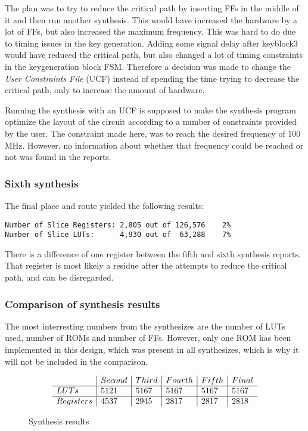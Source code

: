 The plan was to try to reduce the critical path by inserting FFs in the 
middle of it and then run another synthesis. This would have increased 
the hardware by a lot of FFs, but also increased the maximum frequency. 
This was hard to do due to timing issues in the key generation. Adding 
some signal delay after keyblock3 would have reduced the critical path, 
but also changed a lot of timing constraints in the keygeneration 
block FSM. Therefore a decision was made to change the \emph{User 
Constraints File} (UCF) instead of spending the time trying to 
decrease the critical path, only to increase the amount of hardware.

Running the synthesis with an UCF is supposed to make the synthesis 
program optimize the layout of the circuit according to a number of 
constraints provided by the user. The constraint made here, was to 
reach the desired frequency of 100 MHz. However, no information about 
whether that frequency could be reached or not was found in the reports.

\subsubsection{Sixth synthesis}
The final place and route yielded the following results:
\begin{verbatim}
Number of Slice Registers: 2,805 out of 126,576    2%
Number of Slice LUTs:      4,930 out of  63,288    7%
\end{verbatim}

There is a difference of one register between the fifth and sixth 
synthesis reports. That register is most likely a residue after the 
attempts to reduce the critical path, and can be disregarded.

\subsubsection{Comparison of synthesis results}
The most interresting numbers from the synthesizes are the number of 
LUTs used, number of ROMs and number of FFs. However, only one ROM has 
been implemented in this design, which was present in all synthesizes, 
which is why it will not be included in the comparison.
\begin{figure}[h!]
  \begin{equation}
    \begin{array}{l | l | l | l | l | l}
      & Second & Third & Fourth & Fifth & Final \\ \hline
      LUTs       & 5121   & 5167  & 5167   & 5167  & 5167  \\ \hline
      Registers  & 4537   & 2945  & 2817   & 2817  & 2818  \\
    \end{array}
  \end{equation}
  \caption{Synthesis results}
  \label{table:synthesis}
\end{figure}

